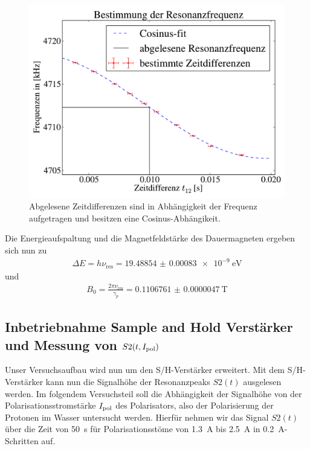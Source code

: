 \documentclass[paper=a4,
	fontsize=10pt,
	DIV=18,
	twocolumn,
	parskip=half
	]{scrartcl}
\numberwithin{equation}{section}    %
\begin{document}
\begin{figure}[htp]
	\begin{center}
		\includegraphics[width=\columnwidth]{Data-Plots/02-Resonanzfrequenz.pdf}
		\caption{Abgelesene Zeitdifferenzen sind in Abhängigkeit der Frequenz aufgetragen und besitzen eine Cosinus-Abhängikeit.}
		\label{resonanzfrequenz}
	\end{center}
\end{figure}
Die Energieaufspaltung und die Magnetfeldstärke des Dauermagneten ergeben sich nun zu
\begin{align}
	\Delta E =h\nu_{\mathrm{res}}=\SI[separate-uncertainty=false]{19.48854(83) e-9}{\eV}
\end{align}
und
\begin{align}
	B_0=\frac{2 \pi \nu_{\mathrm{res}}}{\gamma_p}=\SI[separate-uncertainty=false]{0.1106761(47)}{\tesla}
\end{align}



\subsection{Inbetriebnahme Sample and Hold Verstärker und Messung von $S2(t,I_{\rm pol})$}
\label{auswertung4}

Unser Versuchsaufbau wird nun um den S/H-Verstärker erweitert. Mit dem S/H-Verstärker kann nun die Signalhöhe der Resonanzpeaks $S2(t)$ ausgelesen werden. Im folgendem Versuchsteil soll die Abhängigkeit der Signalhöhe von der Polarisationsstromstärke $I_{\rm pol}$ des Polarisators, also der Polarisierung der Protonen im Wasser untersucht werden. Hierfür nehmen wir das Signal $S2(t)$ über die Zeit von \SI{50}{\second} für Polarisationsstöme von \SI{1.3}{\ampere} bis \SI{2.5}{\ampere} in \SI{0.2}{\ampere}-Schritten auf.
\end{document}
